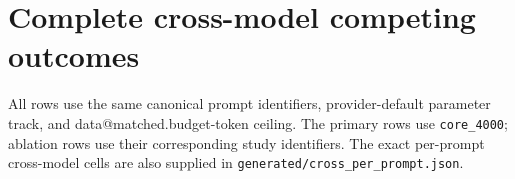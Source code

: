 \documentclass[11pt]{article}
\makeatletter
\newcommand{\D}[1]{\csname data@#1\endcsname}
\makeatother
\begin{document}
\clearpage
\section{Complete cross-model competing outcomes}\label{app:cross}
All rows use the same canonical prompt identifiers, provider-default parameter track, and \D{matched.budget}-token ceiling. The primary rows use \texttt{core\_4000}; ablation rows use their corresponding study identifiers. The exact per-prompt cross-model cells are also supplied in \texttt{generated/cross\_per\_prompt.json}.

\begin{table}[H]
\centering\small

\caption{Complete V0/NV/R accounting for the cross-model comparison. No other outcome class occurs in these selected cells.}
\end{table}
\end{document}
